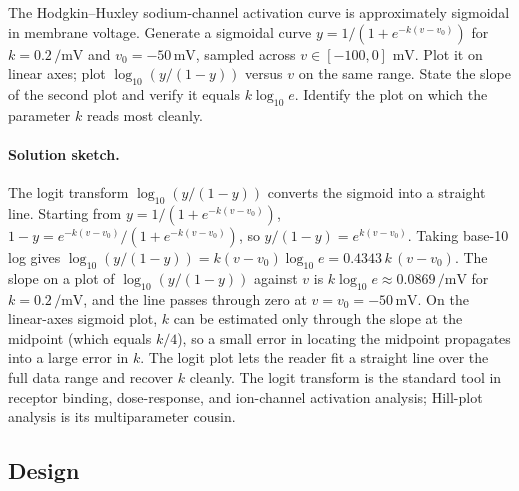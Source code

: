 \begin{exercise}
The Hodgkin--Huxley sodium-channel activation curve is approximately
sigmoidal in membrane voltage. Generate a sigmoidal curve $y =
1/(1 + e^{-k(v - v_{0})})$ for $k = 0.2 \,\si{\per\milli\volt}$ and
$v_{0} = -50 \,\si{\milli\volt}$, sampled across $v \in [-100, 0]$
$\si{\milli\volt}$. Plot it on linear axes; plot $\log_{10}(y/(1-y))$
versus $v$ on the same range. State the slope of the second plot and
verify it equals $k \log_{10} e$. Identify the plot on which the
parameter $k$ reads most cleanly.

\paragraph{Solution sketch.}
The logit transform $\log_{10}(y/(1 - y))$ converts the sigmoid
into a straight line. Starting from $y = 1/(1 + e^{-k(v - v_{0})})$,
$1 - y = e^{-k(v - v_{0})}/(1 + e^{-k(v - v_{0})})$, so
$y/(1 - y) = e^{k(v - v_{0})}$. Taking base-10 log gives
$\log_{10}(y/(1 - y)) = k(v - v_{0}) \log_{10} e = 0.4343\, k\,
(v - v_{0})$. The slope on a plot of $\log_{10}(y/(1 - y))$
against $v$ is $k \log_{10} e \approx 0.0869\,\si{\per\milli\volt}$
for $k = 0.2\,\si{\per\milli\volt}$, and the line passes through
zero at $v = v_{0} = -50\,\si{\milli\volt}$. On the linear-axes
sigmoid plot, $k$ can be estimated only through the slope at the
midpoint (which equals $k/4$), so a small error in locating the
midpoint propagates into a large error in $k$. The logit plot lets
the reader fit a straight line over the full data range and recover
$k$ cleanly. The logit transform is the standard tool in receptor
binding, dose-response, and ion-channel activation analysis;
Hill-plot analysis is its multiparameter cousin.
\end{exercise}

\subsection*{Design}

